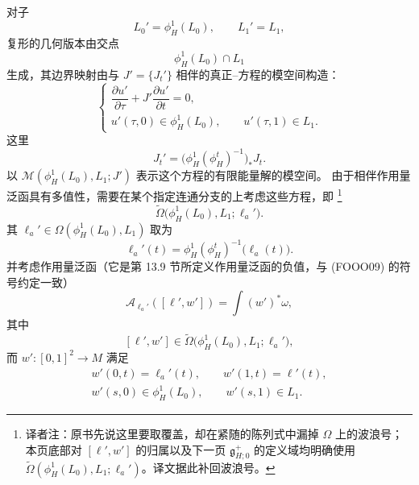 对子
\[
  L_0'=\phi_H^1(L_0),
  \qquad
  L_1'=L_1,
\]
\personFloer{}复形的几何版本由交点
\[
  \phi_H^1(L_0)\cap L_1
\]
生成，其\personFloer{}边界映射由与 $J'=\{J_t'\}$ 相伴的真正\personCauchy{}--\personRiemann{}方程的模空间构造：
\begin{equation}
  \begin{cases}
    \dfrac{\partial u'}{\partial\tau}
    +J'\dfrac{\partial u'}{\partial t}=0,\\[6pt]
    u'(\tau,0)\in\phi_H^1(L_0),
    \qquad
    u'(\tau,1)\in L_1.
  \end{cases}
\label{eq:geometric-moving-lzero-equation}
\end{equation}
这里
\[
  J_t'
  =
  \bigl(\phi_H^1(\phi_H^t)^{-1}\bigr)_*J_t.
\]
以 $\mathcal M(\phi_H^1(L_0),L_1;J')$ 表示这个方程的有限能量解的模空间。
由于相伴作用量泛函具有多值性，需要在某个指定连通分支的\termNovikovCovering{}上考虑这些方程，即
\footnote{译者注：原书先说这里要取\personNovikov{}覆盖，却在紧随的陈列式中漏掉
$\Omega$ 上的波浪号；本页底部对 $[\ell',w']$ 的归属以及下一页
$\mathfrak g_{H;0}^+$ 的定义域均明确使用
$\widetilde\Omega(\phi_H^1(L_0),L_1;\ell_a')$。译文据此补回波浪号。}
\[
  \widetilde\Omega\bigl(\phi_H^1(L_0),L_1;\ell_a'\bigr).
\]
其\termBasePath{} $\ell_a'\in\Omega(\phi_H^1(L_0),L_1)$ 取为
\begin{equation}
  \ell_a'(t)
  =
  \phi_H^1(\phi_H^t)^{-1}\bigl(\ell_a(t)\bigr).
\label{eq:geometric-moving-lzero-base-path}
\end{equation}
并考虑作用量泛函（它是第 13.9 节所定义作用量泛函的负值，与 (FOOO09)
的符号约定一致）
\begin{equation}
  \mathcal A_{\ell_a'}([\ell',w'])
  =
  \int (w')^*\omega,
\label{eq:geometric-action-functional}
\end{equation}
其中
\[
  [\ell',w']
  \in
  \widetilde\Omega\bigl(\phi_H^1(L_0),L_1;\ell_a'\bigr),
\]
而 $w':[0,1]^2\to M$ 满足
\[
  \begin{gathered}
    w'(0,t)=\ell_a'(t),
    \qquad
    w'(1,t)=\ell'(t),\\
    w'(s,0)\in\phi_H^1(L_0),
    \qquad
    w'(s,1)\in L_1.
  \end{gathered}
\]

